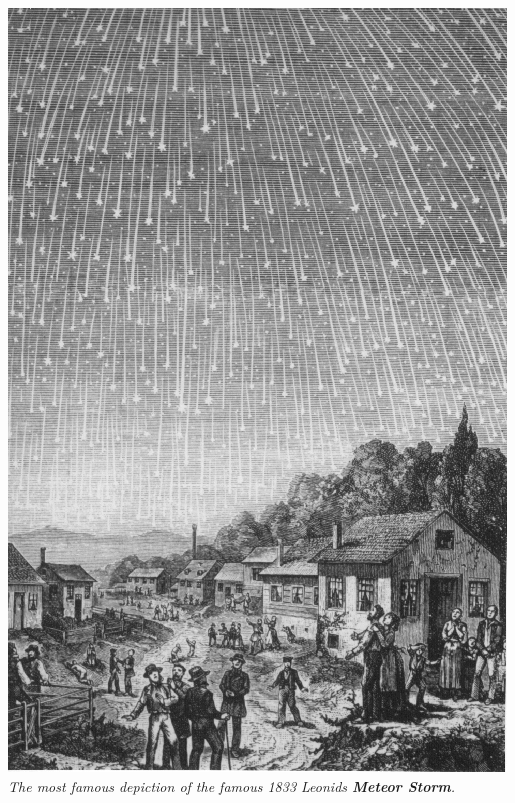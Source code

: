 \begin{multicols}{2}
\begin{itemize}
\begin{center}
	\includegraphics[width=0.9\linewidth]{immagini/Leonids-1833.jpg}\\
	\textit{The most famous depiction of the famous 1833 Leonids \textbf{Meteor Storm}.}
\end{center}


\end{itemize}
\end{multicols}
